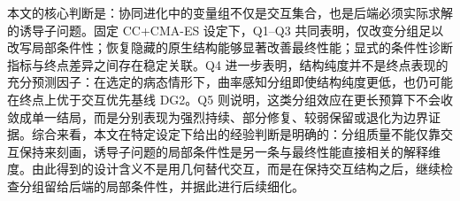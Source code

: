 本文的核心判断是：协同进化中的变量组不仅是交互集合，也是后端必须实际求解的诱导子问题。固定 CC+CMA-ES 设定下，Q1--Q3 共同表明，仅改变分组足以改写局部条件性；恢复隐藏的原生结构能够显著改善最终性能；显式的条件性诊断指标与终点差异之间存在稳定关联。Q4 进一步表明，结构纯度并不是终点表现的充分预测因子：在选定的病态情形下，曲率感知分组即使结构纯度更低，也仍可能在终点上优于交互优先基线 DG2。Q5 则说明，这类分组效应在更长预算下不会收敛成单一结局，而是分别表现为强烈持续、部分修复、较弱保留或退化为边界证据。综合来看，本文在特定设定下给出的经验判断是明确的：分组质量不能仅靠交互保持来刻画，诱导子问题的局部条件性是另一条与最终性能直接相关的解释维度。由此得到的设计含义不是用几何替代交互，而是在保持交互结构之后，继续检查分组留给后端的局部条件性，并据此进行后续细化。
